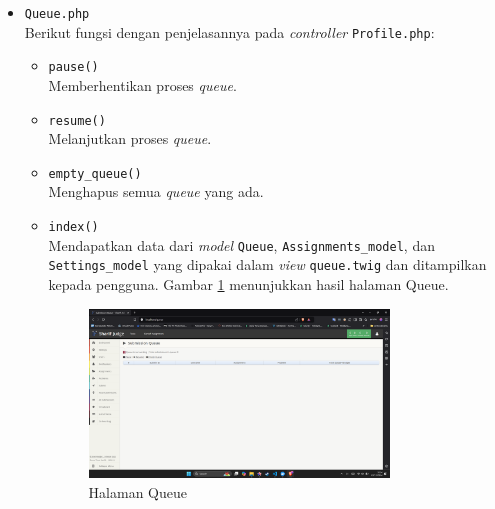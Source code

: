 \documentclass[a4paper,twoside]{article}
\begin{document}
\begin{enumerate}
\begin{itemize}
\begin{itemize}
\begin{itemize}
			                  \end{itemize}

			            \item \verb|Queue.php| \\
			                  Berikut fungsi dengan penjelasannya pada \textit{controller} \verb|Profile.php|:

			                  \begin{itemize}
				                  \item \verb|pause()| \\
				                        Memberhentikan proses \textit{queue}.
				                  \item \verb|resume()| \\
				                        Melanjutkan proses \textit{queue}.
				                  \item \verb|empty_queue()| \\
				                        Menghapus semua \textit{queue} yang ada.
				                  \item \verb|index()| \\
				                        Mendapatkan data dari \textit{model} \verb|Queue|, \verb|Assignments_model|, dan \verb|Settings_model| yang dipakai dalam \textit{view} \verb|queue.twig| dan ditampilkan kepada pengguna. Gambar \ref{fig:3:1:1:queue} menunjukkan hasil halaman Queue.

				                        \begin{figure}[H]
					                        \centering
					                        \includegraphics[width=0.8\textwidth]{views/queue.png}
					                        \caption{Halaman Queue}
					                        \label{fig:3:1:1:queue}
				                        \end{figure}

			                  \end{itemize}


\end{itemize}
\end{itemize}
\end{enumerate}
\end{document}
